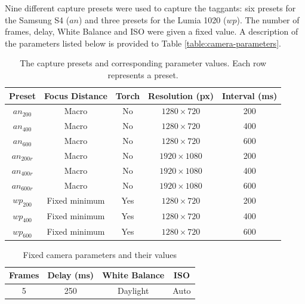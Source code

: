 \documentclass[thesis.tex]{subfiles}
\begin{document}
Nine different capture presets were used to capture the taggants: six presets for the Samsung S4 ($an$) and three presets for the Lumia 1020 ($wp$). The number of frames, delay, White Balance and ISO were given a fixed value. A description of the parameters listed below is provided to Table \ref{table:camera-parameters}.

\begin{table}[ht]
  \caption{The capture presets and corresponding parameter values. Each row represents a preset.}

  \begin{center}
  \begin{tabular}{| c | c | c | c | c |}
    \hline
    \textbf{Preset} & \textbf{Focus Distance} & \textbf{Torch} & \textbf{Resolution (px)} & \textbf{Interval (ms)} \\ \hline
    $an_{200}$ & Macro & No & $1280\times720$ & 200 \\
    \hline
    $an_{400}$ & Macro & No & $1280\times720$ & 400 \\
    \hline
    $an_{600}$ & Macro & No & $1280\times720$ & 600 \\
    \hline
    $an_{200r}$ & Macro & No & $1920\times1080$ & 200 \\
    \hline
    $an_{400r}$ & Macro & No & $1920\times1080$ & 400 \\
    \hline
    $an_{600r}$ & Macro & No & $1920\times1080$ & 600 \\
    \hline
    $wp_{200}$ & Fixed minimum & Yes & $1280\times720$ & 200 \\
    \hline
    $wp_{400}$ & Fixed minimum & Yes & $1280\times720$ & 400 \\
    \hline
    $wp_{600}$ & Fixed minimum & Yes & $1280\times720$ & 600 \\
    \hline
  \end{tabular}
  \end{center}
\end{table}

\begin{table}[ht]
  \caption{Fixed camera parameters and their values}

  \begin{center}
  \begin{tabular}{| c | c | c | c |}
    \hline
    \textbf{Frames}  & \textbf{Delay (ms)} & \textbf{White Balance} & \textbf{ISO} \\ \hline
    5 & 250 & Daylight & Auto \\
    \hline
  \end{tabular}
  \end{center}
\end{table}
\end{document}
